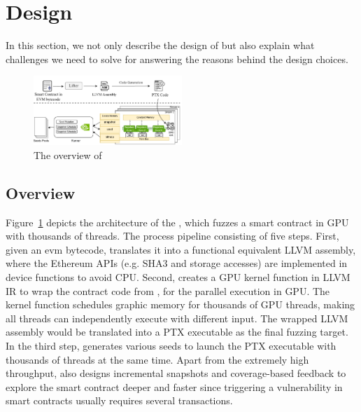 \section{Design}
In this section, we not only describe the design of  {\tool} but also explain what challenges we need to solve for answering the reasons behind the design choices.  

\begin{figure}[t]
\centerline{\includegraphics[width=0.5\textwidth]{images/GFL-overview.drawio.pdf}}
\caption{The overview of {\tool}}
\vspace{-0.1in}
\label{fig:overview}
\end{figure}


\subsection{Overview}
Figure~\ref{fig:overview} depicts the architecture of the {\tool}, which fuzzes a smart contract in GPU with thousands of threads.  
%
The process pipeline consisting of five steps. 
%
First, given an evm bytecode, {\translator} translates it into a functional equivalent LLVM assembly, where the Ethereum APIs (e.g. SHA3 and storage accesses) are implemented in device functions to avoid CPU.
%
Second, {\wrapper} creates a GPU kernel function in LLVM IR to wrap the contract code from {\translator}, for the parallel execution in GPU. The kernel function schedules graphic memory for thousands of GPU threads, making all threads can independently execute with different input. The wrapped LLVM assembly would be translated into a PTX executable as the final fuzzing target. 
%
In the third step, {\runner} generates various seeds to launch the PTX executable with thousands of threads at the same time. Apart from the extremely high throughput, {\runner} also designs incremental snapshots and coverage-based feedback to explore the smart contract deeper and faster since triggering a vulnerability in smart contracts usually requires several transactions\cite{}. 

